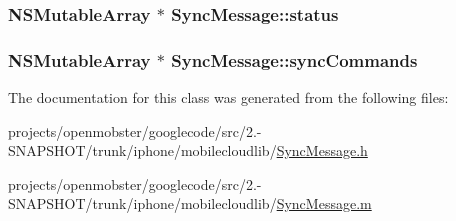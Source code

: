 \hypertarget{interface_sync_message_a8b3f2df455e9e7f88c6826ebcb0caa7d}{
\subsubsection[{status}]{\setlength{\rightskip}{0pt plus 5cm}\-N\-S\-Mutable\-Array $\ast$ \-Sync\-Message\-::status}}
\label{interface_sync_message_a8b3f2df455e9e7f88c6826ebcb0caa7d}
\hypertarget{interface_sync_message_a022ca7fd27c57d2f473f4a80b201b1ee}{
\subsubsection[{sync\-Commands}]{\setlength{\rightskip}{0pt plus 5cm}\-N\-S\-Mutable\-Array $\ast$ \-Sync\-Message\-::sync\-Commands}}
\label{interface_sync_message_a022ca7fd27c57d2f473f4a80b201b1ee}


\-The documentation for this class was generated from the following files\-:\begin{DoxyCompactItemize}
\item 
projects/openmobster/googlecode/src/2.-\/\-S\-N\-A\-P\-S\-H\-O\-T/trunk/iphone/mobilecloudlib/\hyperlink{_sync_message_8h}{\-Sync\-Message.\-h}\item 
projects/openmobster/googlecode/src/2.-\/\-S\-N\-A\-P\-S\-H\-O\-T/trunk/iphone/mobilecloudlib/\hyperlink{_sync_message_8m}{\-Sync\-Message.\-m}\end{DoxyCompactItemize}
